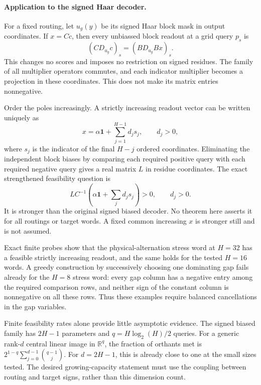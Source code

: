 \documentclass[11pt]{article}
\begin{document}
\paragraph{Application to the signed Haar decoder.}
For a fixed routing, let $u_g(y)$ be its signed Haar block mask in output
coordinates. If $x=Cc$, then every unbiassed block readout at a grid query
$p_s$ is
\[
 (C D_{u_g}c)_s=(B D_{u_g}B x)_s.
\]
This changes no scores and imposes no restriction on signed residues.
The family of all multiplier operators commutes, and each indicator
multiplier becomes a projection in these coordinates. This does not
make its matrix entries nonnegative.

Order the poles increasingly. A strictly increasing readout vector can
be written uniquely as
\[
 x=\alpha\mathbf1+\sum_{j=1}^{H-1}d_j s_j,
 \qquad d_j>0,
\]
where $s_j$ is the indicator of the final $H-j$ ordered coordinates.
Eliminating the independent block biases by comparing each required
positive query with each required negative query gives a real matrix
$L$ in residue coordinates. The exact strengthened feasibility question
is
\[
 L C^{-1}\left(\alpha\mathbf1+\sum_jd_js_j\right)>0,
 \qquad d_j>0.
\]
It is stronger than the original signed biased decoder. No theorem here
asserts it for all routings or target words. A fixed common increasing
$x$ is stronger still and is not assumed.

Exact finite probes show that the physical-alternation stress word at
$H=32$ has a feasible strictly increasing readout, and the same holds for
the tested $H=16$ words. A greedy construction by successively choosing
one dominating gap fails already for the $H=8$ stress word: every gap
column has a negative entry among the required comparison rows, and
neither sign of the constant column is nonnegative on all these rows.
Thus these examples require balanced cancellations in the gap variables.

Finite feasibility rates alone provide little asymptotic evidence.
The signed biased family has $2H-1$ parameters and
$q=H\log_2(H)/2$ queries. For a generic rank-$d$ central linear image in
$\mathbb R^q$, the fraction of orthants met is
$2^{1-q}\sum_{j=0}^{d-1}\binom{q-1}{j}$.
For $d=2H-1$, this is already close to one at the small sizes tested.
The desired growing-capacity statement must use the coupling between
routing and target signs, rather than this dimension count.
\end{document}
